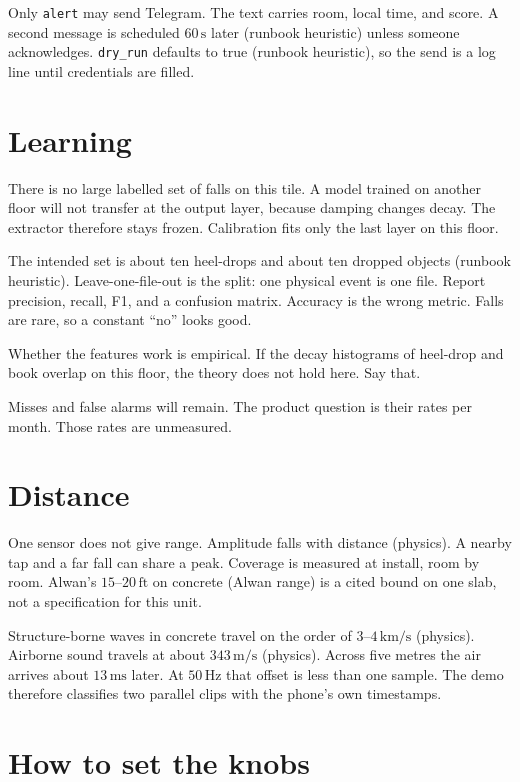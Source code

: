 \documentclass[11pt,a4paper]{article}
\newcommand{\src}[1]{\textnormal{\small (#1)}}
\begin{document}
Only \texttt{alert} may send Telegram. The text carries room, local time, and score. A second message is scheduled \(60\,\mathrm{s}\) later \src{runbook heuristic} unless someone acknowledges. \texttt{dry\_run} defaults to true \src{runbook heuristic}, so the send is a log line until credentials are filled.

\section{Learning}

There is no large labelled set of falls on this tile. A model trained on another floor will not transfer at the output layer, because damping changes decay. The extractor therefore stays frozen. Calibration fits only the last layer on this floor.

The intended set is about ten heel-drops and about ten dropped objects \src{runbook heuristic}. Leave-one-file-out is the split: one physical event is one file. Report precision, recall, F1, and a confusion matrix. Accuracy is the wrong metric. Falls are rare, so a constant ``no'' looks good.

Whether the features work is empirical. If the decay histograms of heel-drop and book overlap on this floor, the theory does not hold here. Say that.

Misses and false alarms will remain. The product question is their rates per month. Those rates are unmeasured.

\section{Distance}

One sensor does not give range. Amplitude falls with distance \src{physics}. A nearby tap and a far fall can share a peak. Coverage is measured at install, room by room. Alwan's \(15\)--\(20\,\mathrm{ft}\) on concrete \src{Alwan range} is a cited bound on one slab, not a specification for this unit.

Structure-borne waves in concrete travel on the order of \(3\)--\(4\,\mathrm{km/s}\) \src{physics}. Airborne sound travels at about \(343\,\mathrm{m/s}\) \src{physics}. Across five metres the air arrives about \(13\,\mathrm{ms}\) later. At \(50\,\mathrm{Hz}\) that offset is less than one sample. The demo therefore classifies two parallel clips with the phone's own timestamps.

\section{How to set the knobs}
\end{document}
